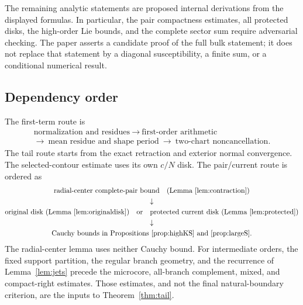 \documentclass[11pt]{article}
\numberwithin{equation}{section}
\theoremstyle{definition}
\begin{document}
The remaining analytic statements are proposed internal derivations
from the displayed formulas. In particular, the pair compactness
estimates, all protected disks, the high-order Lie bounds, and
the complete sector sum require adversarial checking.
The paper asserts a candidate proof of the full bulk statement;
it does not replace that statement by a diagonal susceptibility,
a finite sum, or a conditional numerical result.

\subsection{Dependency order}
The first-term route is
\[
 \begin{gathered}
 \text{normalization and residues}
 \ \longrightarrow\ \text{first-order arithmetic}\\
 \longrightarrow\ \text{mean residue and shape period}
 \ \longrightarrow\ \text{two-chart noncancellation}.
 \end{gathered}
\]
The tail route starts from the exact retraction and exterior normal
convergence. The selected-contour estimate uses its own \(c/N\)
disk. The pair/current route is ordered as
\[
 \begin{gathered}
 \text{radial-center complete-pair bound}
       \quad\text{(Lemma~\ref{lem:contraction})}\\
 \downarrow\\
 \text{original disk (Lemma~\ref{lem:originaldisk})}
 \quad\text{or}\quad
 \text{protected current disk (Lemma~\ref{lem:protected})}\\
 \downarrow\\
 \text{Cauchy bounds in Propositions~\ref{prop:highKS}
       and \ref{prop:largeS}.}
 \end{gathered}
\]
The radial-center lemma uses neither Cauchy bound.
For intermediate orders, the fixed support partition, the regular
branch geometry, and the recurrence of Lemma~\ref{lem:jets} precede
the microcore, all-branch complement, mixed, and compact-right
estimates. Those estimates, and not the final natural-boundary
criterion, are the inputs to Theorem~\ref{thm:tail}.
\end{document}
